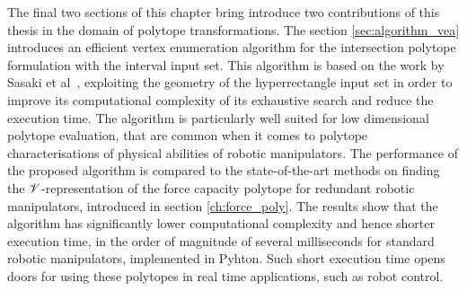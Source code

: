 The final two sections of this chapter bring introduce two contributions of this thesis in the domain of polytope transformations. The section \ref{sec:algorithm_vea} introduces an efficient vertex enumeration algorithm for the intersection polytope formulation with the interval input set. This algorithm is based on the work by Sasaki et al~\cite{sasaki2011vertex}, exploiting the geometry of the hyperrectangle input set in order to improve its computational complexity of its exhaustive search and reduce the execution time. The algorithm is particularly well suited for low dimensional polytope evaluation, that are common when it comes to polytope characterisations of physical abilities of robotic manipulators. The performance of the proposed algorithm is compared to the state-of-the-art methods on finding the $\mathscr{V}$-representation of the force capacity polytope for redundant robotic manipulators, introduced in section \ref{ch:force_poly}. The results show that the algorithm has significantly lower computational complexity and hence shorter execution time, in the order of magnitude of several milliseconds for standard robotic manipulators, implemented in Pyhton. Such short execution time opens doors for using these polytopes in real time applications, such as robot control. 

